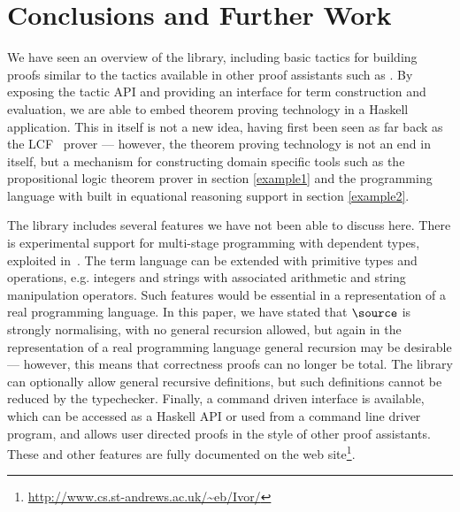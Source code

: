 \section{Conclusions and Further Work}

We have seen an overview of the \Ivor{} library, including basic
tactics for building proofs similar to the tactics available in other
proof assistants such as \Coq{}. By exposing the tactic API and
providing an interface for term construction and evaluation, we are
able to embed theorem proving technology in a Haskell
application. This in itself is not a new idea, having first been seen
as far back as the LCF~\cite{lcf-milner} prover --- however, the
theorem proving technology is not an end in itself, but a
mechanism for constructing domain specific tools such as the
propositional logic theorem prover in section \ref{example1} and the
programming language with built in equational reasoning support in
section \ref{example2}.

The library includes several features we have not been able to discuss
here. There is experimental support for multi-stage programming with
dependent types, exploited in~\cite{dtpmsp-gpce}.  The term language
can be extended with primitive types and operations, e.g. integers and
strings with associated arithmetic and string manipulation
operators. Such features would be essential in a representation of a
real programming language. In this paper, we have stated that
$\source$ is strongly normalising, with no general recursion allowed,
but again in the representation of a real programming language general
recursion may be desirable --- however, this means that correctness
proofs can no longer be total. The library can optionally allow
general recursive definitions, but such definitions cannot be
reduced by the typechecker. Finally, a command driven interface is
available, which can be accessed as a Haskell API or used from a
command line driver program, and allows user directed proofs in the
style of other proof assistants. These and other features are fully
documented on the web site\footnote{\url{http://www.cs.st-andrews.ac.uk/~eb/Ivor/}}.


